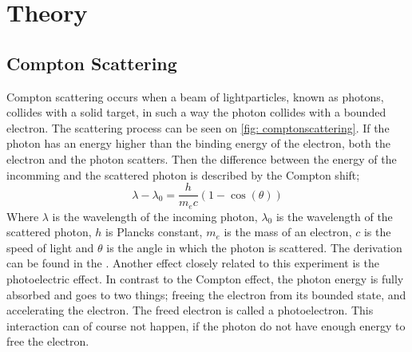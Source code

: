 \section{Theory}
\subsection{Compton Scattering} Compton scattering occurs when a beam of
lightparticles, known as photons, collides with a solid target, in such a way
the photon collides with a bounded electron. The scattering process can be seen
on \cref{fig: comptonscattering}.  If the photon has an energy higher than the
binding energy of the electron, both the electron and the photon scatters. Then
the difference between the energy of the incomming and the scattered photon is
described by the Compton shift;
\begin{equation}
    \lambda - \lambda_0 = \frac{h}{m_ec}(1-\cos(\theta))
    \label{eq: comptonshift}
\end{equation}
Where $\lambda$ is the wavelength of the incoming photon, $\lambda_0$ is the
wavelength of the scattered photon, $h$ is Plancks constant, $m_e$ is the mass
of an electron, $c$ is the speed of light and $\theta$ is the angle in which
the photon is scattered. The derivation can be found in the .
Another effect closely related to this experiment is the photoelectric effect.
In contrast to the Compton effect, the photon energy is fully absorbed and goes
to two things; freeing the electron from its bounded state, and accelerating
the electron. The freed electron is called a photoelectron. This interaction
can of course not happen, if the photon do not have enough energy to free the
electron.
